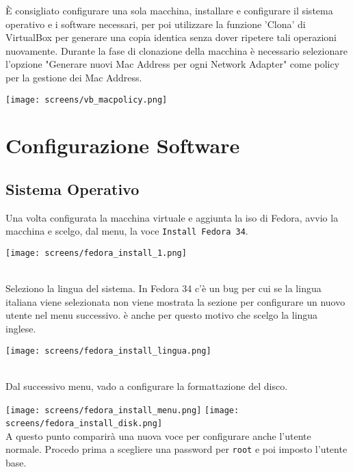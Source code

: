 \`{E} consigliato configurare una sola macchina, installare e configurare il sistema operativo e i software necessari, per poi utilizzare la funzione 'Clona' di VirtualBox per generare una copia identica senza dover ripetere tali operazioni nuovamente. Durante la fase di clonazione della macchina \`{e} necessario selezionare l'opzione "Generare nuovi Mac Address per ogni Network Adapter" come policy per la gestione dei Mac Address.

\begin{center}
	\texttt{[image: screens/vb\_macpolicy.png]}
\end{center}
 
\section{Configurazione Software}

\subsection{Sistema Operativo}

Una volta configurata la macchina virtuale e aggiunta la iso di Fedora, avvio la macchina e scelgo, dal menu, la voce \lstinline[style=cmd]|Install Fedora 34|.

\begin{center}
	\texttt{[image: screens/fedora\_install\_1.png]}
\end{center}
\ \\
Seleziono la lingua del sistema. In Fedora  34 c'\`{e} un bug per cui se la lingua italiana viene selezionata non viene mostrata la sezione per configurare un nuovo utente nel menu successivo. \`{e} anche per questo motivo che scelgo la lingua inglese.

\begin{center}
	\texttt{[image: screens/fedora\_install\_lingua.png]}
\end{center}
\ \\
Dal successivo menu, vado a configurare la formattazione del disco.

\texttt{[image: screens/fedora\_install\_menu.png]}
\texttt{[image: screens/fedora\_install\_disk.png]}
\ \\
A questo punto comparir\`{a} una nuova voce per configurare anche l'utente normale. Procedo prima a scegliere una password per \lstinline[style=cmd]|root| e poi imposto l'utente base.

